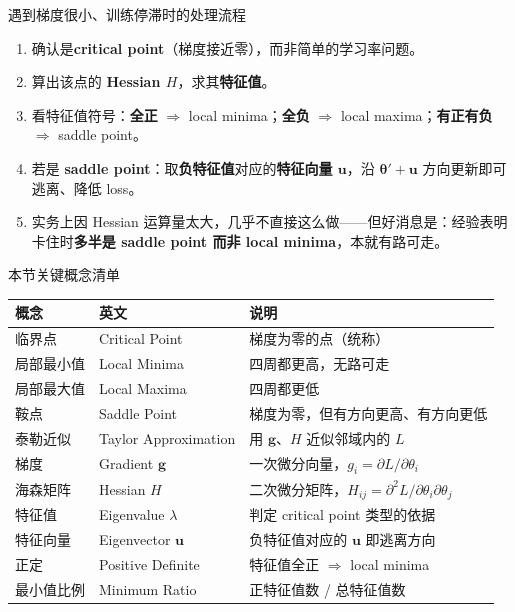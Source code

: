 \documentclass[a4paper]{article}
\begin{document}
\begin{importantbox}{遇到梯度很小、训练停滞时的处理流程}
    \begin{enumerate}
        \item 确认是\textbf{critical point}（梯度接近零），而非简单的学习率问题。
        \item 算出该点的 \textbf{Hessian $H$}，求其\textbf{特征值}。
        \item 看特征值符号：\textbf{全正} $\Rightarrow$ local minima；\textbf{全负} $\Rightarrow$ local maxima；\textbf{有正有负} $\Rightarrow$ saddle point。
        \item 若是 \textbf{saddle point}：取\textbf{负特征值}对应的\textbf{特征向量 $\boldsymbol{u}$}，沿 $\boldsymbol{\theta}'+\boldsymbol{u}$ 方向更新即可逃离、降低 loss。
        \item 实务上因 Hessian 运算量太大，几乎不直接这么做——但好消息是：经验表明卡住时\textbf{多半是 saddle point 而非 local minima}，本就有路可走。
    \end{enumerate}
\end{importantbox}

\begin{knowledgebox}{本节关键概念清单}
    \begin{center}
    \begin{tabular}{lll}
        \toprule
        \textbf{概念} & \textbf{英文} & \textbf{说明} \\
        \midrule
        临界点 & Critical Point & 梯度为零的点（统称） \\
        局部最小值 & Local Minima & 四周都更高，无路可走 \\
        局部最大值 & Local Maxima & 四周都更低 \\
        鞍点 & Saddle Point & 梯度为零，但有方向更高、有方向更低 \\
        泰勒近似 & Taylor Approximation & 用 $\boldsymbol{g}$、$H$ 近似邻域内的 $L$ \\
        梯度 & Gradient $\boldsymbol{g}$ & 一次微分向量，$g_i=\partial L/\partial\theta_i$ \\
        海森矩阵 & Hessian $H$ & 二次微分矩阵，$H_{ij}=\partial^2 L/\partial\theta_i\partial\theta_j$ \\
        特征值 & Eigenvalue $\lambda$ & 判定 critical point 类型的依据 \\
        特征向量 & Eigenvector $\boldsymbol{u}$ & 负特征值对应的 $\boldsymbol{u}$ 即逃离方向 \\
        正定 & Positive Definite & 特征值全正 $\Rightarrow$ local minima \\
        最小值比例 & Minimum Ratio & 正特征值数 / 总特征值数 \\
        \bottomrule
    \end{tabular}
    \end{center}
\end{knowledgebox}
\end{document}
